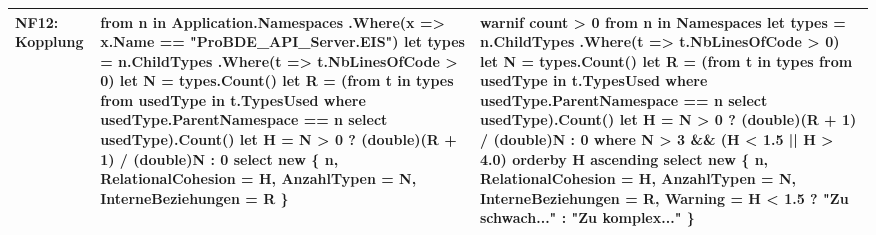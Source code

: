 \begin{longtable}{|>{\raggedright\arraybackslash}p{}|>{\raggedright\arraybackslash}p{}|>{\raggedright\arraybackslash}p{}|}
NF12: Kopplung &
{\ttfamily
from n in Application.Namespaces\newline
\quad .Where(x => x.Name == \newline
\quad \quad "ProBDE\_API\_Server.EIS")\newline
let types = n.ChildTypes\newline
\quad .Where(t => t.NbLinesOfCode > 0)\newline
let N = types.Count()\newline
let R = (from t in types\newline
\quad from usedType in t.TypesUsed\newline
\quad where usedType.ParentNamespace \newline
\quad \quad == n\newline
\quad select usedType).Count()\newline
let H = N > 0 ? \newline
\quad (double)(R + 1) / (double)N : 0\newline
select new \{ n, \newline
\quad RelationalCohesion = H, \newline
\quad AnzahlTypen = N, \newline
\quad InterneBeziehungen = R \}
}
&
{\ttfamily
warnif count > 0\newline
from n in Namespaces\newline
let types = n.ChildTypes\newline
\quad .Where(t => t.NbLinesOfCode > 0)\newline
let N = types.Count()\newline
let R = (from t in types\newline
\quad from usedType in t.TypesUsed\newline
\quad where usedType.ParentNamespace \newline
\quad \quad == n\newline
\quad select usedType).Count()\newline
let H = N > 0 ? \newline
\quad (double)(R + 1) / (double)N : 0\newline
where N > 3 \&\& \newline
\quad (H < 1.5 || H > 4.0)\newline
orderby H ascending\newline
select new \{ n, \newline
\quad RelationalCohesion = H, \newline
\quad AnzahlTypen = N, \newline
\quad InterneBeziehungen = R, \newline
\quad Warning = H < 1.5 ? \newline
\quad \quad "Zu schwach..." : "Zu komplex..." \}
}
\\ \hline


\end{longtable}
